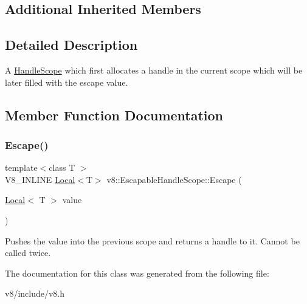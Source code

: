 \subsection*{Additional Inherited Members}


\subsection{Detailed Description}
A \mbox{\hyperlink{classv8_1_1HandleScope}{Handle\+Scope}} which first allocates a handle in the current scope which will be later filled with the escape value. 

\subsection{Member Function Documentation}
\mbox{\label{classv8_1_1EscapableHandleScope_afdf0d3850978f65d1a827f78b3a2b6fd}} 
\subsubsection{\texorpdfstring{Escape()}{Escape()}}
{\footnotesize\ttfamily template$<$class T $>$ \\
V8\+\_\+\+I\+N\+L\+I\+NE \mbox{\hyperlink{classv8_1_1Local}{Local}}$<$T$>$ v8\+::\+Escapable\+Handle\+Scope\+::\+Escape (\begin{DoxyParamCaption}\item[{\mbox{\hyperlink{classv8_1_1Local}{Local}}$<$ T $>$}]{value }\end{DoxyParamCaption})\hspace{0.3cm}{\ttfamily [inline]}}

Pushes the value into the previous scope and returns a handle to it. Cannot be called twice. 

The documentation for this class was generated from the following file\+:\begin{DoxyCompactItemize}
\item 
v8/include/v8.\+h\end{DoxyCompactItemize}
